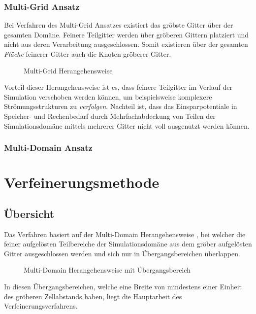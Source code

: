 \documentclass[12pt,a4paper]{scrartcl}
\numberwithin{equation}{section}
\begin{document}
\subsubsection{Multi-Grid Ansatz}

Bei Verfahren des Multi-Grid Ansatzes existiert das gröbste Gitter über der gesamten Domäne. Feinere Teilgitter werden über gröberen Gittern platziert und nicht aus deren Verarbeitung ausgeschlossen. Somit existieren über der gesamten \emph{Fläche} feinerer Gitter auch die Knoten gröberer Gitter.

\begin{figure}[h]
\centering

\caption{Multi-Grid Herangehensweise}
\end{figure}

Vorteil dieser Herangehensweise ist es, dass feinere Teilgitter im Verlauf der Simulation verschoben werden können, um beispielsweise komplexere Strömungsstrukturen zu \emph{verfolgen}. Nachteil ist, dass das Einsparpotentiale in Speicher- und Rechenbedarf durch Mehrfachabdeckung von Teilen der Simulationsdomäne mittels mehrerer Gitter nicht voll ausgenutzt werden können.

\subsubsection{Multi-Domain Ansatz}

\newpage
\section{Verfeinerungsmethode}

\subsection{Übersicht}

Das Verfahren basiert auf der Multi-Domain Herangehensweise \cite[S.~4]{lagrava12} , bei welcher die feiner aufgelösten Teilbereiche der Simulationsdomäne aus dem gröber aufgelösten Gitter ausgeschlossen werden und sich nur in Übergangsbereichen überlappen.

\begin{figure}[h]
\centering

\caption{Multi-Domain Herangehensweise mit Übergangsbereich \cite[vgl.~Abb.~3]{lagrava12}}
\end{figure}

In diesen Übergangsbereichen, welche eine Breite von mindestens einer Einheit des gröberen Zellabstands haben, liegt die Hauptarbeit des Verfeinerungsverfahrens.
\end{document}
